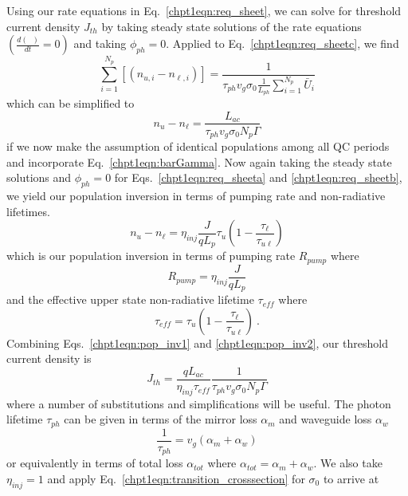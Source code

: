 \documentclass[12pt]{report}
\begin{document}
{Using our rate equations in Eq.~\eqref{chpt1eqn:req_sheet}, we can solve for threshold current density $J_{th}$ by taking steady state solutions of the rate equations $\left(\frac{d (\;\;)}{d\!t}=0\right)$ and taking $\phi_{ph}=0$.  Applied to Eq.~\eqref{chpt1eqn:req_sheetc}, we find
\begin{equation}
\sum_{i=1}^{N_p}\left[ \left(n_{u,i} - n_{\ell,i}\right) \right] = \frac{1}{\tau_{ph} v_g \sigma_0 \frac{1}{L_{ph}} \sum_{i=1}^{N_p} \bar{U}_i}
\end{equation}
which can be simplified to
\begin{equation}
\label{chpt1eqn:pop_inv1}
n_u - n_\ell = \frac{L_{ac}}{\tau_{ph} v_g \sigma_0  N_p \Gamma}
\end{equation}
if we now make the assumption of identical populations among all QC periods and incorporate Eq.~\eqref{chpt1eqn:barGamma}.  Now again taking the steady state solutions and $\phi_{ph}=0$ for Eqs.~\eqref{chpt1eqn:req_sheeta} and \eqref{chpt1eqn:req_sheetb}, we yield our population inversion in terms of pumping rate and non-radiative lifetimes.
\begin{equation}
\label{chpt1eqn:pop_inv2}
n_u-n_\ell = \eta_{inj} \frac{J}{q L_{p}} \tau_u \left(1-\frac{\tau_\ell}{\tau_{u\ell}}\right)
\end{equation}
which is our population inversion in terms of pumping rate $R_{pump}$ where
\begin{equation}
R_{pump} = \eta_{inj} \frac{J}{q L_{p}}
\end{equation}
and the effective upper state non-radiative lifetime $\tau_{eff}$ where
\begin{equation}
\tau_{eff}=\tau_u \left(1-\frac{\tau_\ell}{\tau_{u\ell}}\right) {~.}
\end{equation}
Combining Eqs.~\eqref{chpt1eqn:pop_inv1} and \eqref{chpt1eqn:pop_inv2}, our threshold current density is
\begin{equation}
J_{th} = \frac{q L_{ac}}{\eta_{inj} \tau_{eff}} \frac{1}{\tau_{ph} v_g \sigma_0  N_p \Gamma}
\end{equation}
where a number of substitutions and simplifications will be useful.  The photon lifetime $\tau_{ph}$ can be given in terms of the mirror loss $\alpha_m$ and waveguide loss $\alpha_w$ 
\begin{equation}
\frac{1}{\tau_{ph}}=v_g (\alpha_m + \alpha_w)
\end{equation}
or equivalently in terms of total loss $\alpha_{tot}$ where $\alpha_{tot}=\alpha_m+\alpha_w$.  We also take $\eta_{inj}=1$ and apply Eq.~\eqref{chpt1eqn:transition_crosssection} for $\sigma_0$ to arrive at
}
\end{document}
